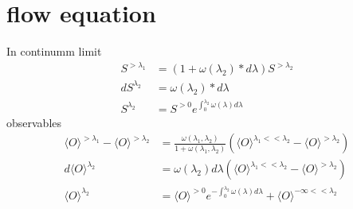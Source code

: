\documentclass{article}
\begin{document}
    \section{flow equation}
    In continumm limit
    \begin{equation}
        \begin{aligned}
            S^{>\lambda_{1}} &= (1 + \omega (\lambda_{2})* d \lambda) S^{>\lambda_{2}}\\
            d S^{\lambda_{2}} &= \omega (\lambda_{2})*d \lambda \\
            S^{\lambda_{2}} & = S^{>0} e^{\int^{\lambda_{2}}_{0} \omega(\lambda) d\lambda}
        \end{aligned}
    \end{equation}
    observables
    \begin{equation}
        \begin{aligned}
            \langle O \rangle^{>\lambda_{1}} - \langle O \rangle^{>\lambda_{2}} &= 
            \frac{\omega(\lambda_{1}, \lambda_{2})}{1+\omega(\lambda_{1},\lambda_{2})} (\langle O \rangle^{\lambda_{1}<<\lambda_{2}} - \langle O \rangle^{>\lambda_{2}} ) \\
            d \langle O \rangle^{\lambda_{2}} &= \omega(\lambda_{2}) d \lambda (\langle O \rangle^{\lambda_{1}<<\lambda_{2}} - \langle O \rangle^{>\lambda_{2}} ) \\
            \langle O \rangle^{\lambda_{2}} & = \langle O \rangle^{>0} e^{-\int^{\lambda_{2}}_{0} \omega(\lambda) d\lambda} + \langle O \rangle^{-\infty<<\lambda_{2}}
        \end{aligned}
    \end{equation}
\end{document}
